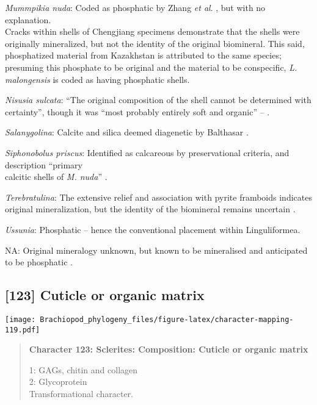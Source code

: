 \documentclass[openany]{book}
\theoremstyle{definition}
\theoremstyle{definition}
\theoremstyle{definition}
\theoremstyle{remark}
\begin{document}
\hypertarget{Mummpikia_nuda-coding-122}{}
\emph{Mummpikia nuda}: Coded as phosphatic by Zhang \emph{et al}.
\citeyearpar{Zhang2014Anearly}, but with no explanation.\\
Cracks within shells of Chengjiang specimens \citep[e.g.][fig.
3]{Zhang2007Noteon} demonstrate that the shells were originally
mineralized, but not the identity of the original biomineral. This said,
phosphatized material from Kazakhstan \citep{Holmer1997EarlyCambrian} is
attributed to the same species; presuming this phosphate to be original
and the material to be conspecific, \emph{L. malongensis} is coded as
having phosphatic shells.

\hypertarget{Nisusia_sulcata-coding-122}{}
\emph{Nisusia sulcata}: ``The original composition of the shell cannot
be determined with certainty'', though it was ``most probably entirely
soft and organic'' -- \citet{Zhang2011Theexceptionally}.

\hypertarget{Salanygolina-coding-122}{}
\emph{Salanygolina}: Calcite and silica deemed diagenetic by Balthasar
\citeyearpar{Balthasar2004Shellstructure}.

\hypertarget{Siphonobolus_priscus-coding-122}{}
\emph{Siphonobolus priscus}: Identified as calcareous by preservational
criteria, and description ``primary\\
calcitic shells of \emph{M. nuda}'' \citep{Balthasar2008iMummpikia}.

\hypertarget{Terebratulina-coding-122}{}
\emph{Terebratulina}: The extensive relief and association with pyrite
framboids indicates original mineralization, but the identity of the
biomineral remains uncertain \citep{Zhang2013}.

\hypertarget{Ussunia-coding-122}{}
\emph{Ussunia}: Phosphatic -- hence the conventional placement within
Linguliformea.

\hypertarget{NA-coding-122}{}
NA: Original mineralogy unknown, but known to be mineralised and
anticipated to be phosphatic \citep{Holmer2009Theenigmatic}.

\subsection*{{[}123{]} Cuticle or organic
matrix}\label{cuticle-or-organic-matrix}

\texttt{[image: Brachiopod\_phylogeny\_files/figure-latex/character-mapping-119.pdf]}

\begin{quote}
\textbf{Character 123: Sclerites: Composition: Cuticle or organic
matrix}

1: GAGs, chitin and collagen\\
2: Glycoprotein\\
Transformational character.
\end{quote}
\end{document}
